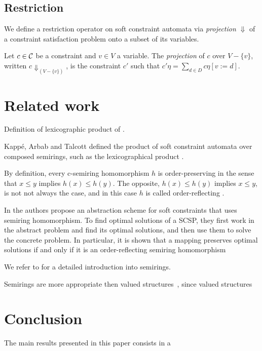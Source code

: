 \documentclass[runningheads]{llncs}
\newcommand{\C}{{\cal C}}
\begin{document}
\subsection{Restriction}
\label{sec:restriction}

We define a restriction operator on soft constraint automata via {\em projection} $\Downarrow$ of a constraint satisfaction problem onto a subset of its variables.

Let $c \in \C$ be a constraint and $v \in V$ a variable. The {\em
projection} of $c$ over $V-\{v\}$, written $c\Downarrow_{(V-\{v\})}$,
is the constraint $c'$ such that $c'\eta = \sum_{d \in D} c \eta
[v:=d]$.





\section{Related work}
\label{sec:related}

Definition of lexicographic product of \cite{GHMW13}.

Kapp\'{e}, Arbab and Talcott defined the product of soft constraint automata over composed semirings, such as the lexicographical product \cite{KAT16}.

By definition, every c-semiring homomorphism $h$ is order-preserving in the sense that $x \leq y$ implies $h(x) \leq h(y)$.
The opposite, $h(x) \leq h(y)$ implies $x \leq y$, is not not always the case, and in this case $h$ is called order-reflecting \cite{LY08}.  

In \cite{LY08} the authors propose an abstraction scheme for soft constraints that uses semiring homomorphism. To find optimal solutions of a SCSP, they first work in the abstract problem and find its optimal solutions, and then use them to solve the concrete problem. In particular, it is shown that a mapping preserves optimal solutions if and only if it is an order-reflecting semiring homomorphism

We refer to \cite{Golan13} for a detailed introduction into semirings.


Semirings are more appropriate then valued structures~\cite{BMRSVF99}, since valued structures 


\section{Conclusion}\label{sec:conclusion}
The main results presented in this paper consists in a 


 

\end{document}
